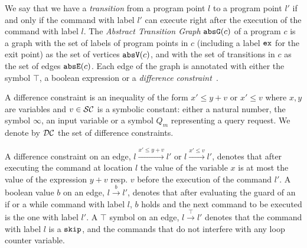 %
We say that we have a \emph{transition} from a program point $l$ to a
program point $l'$ if and only if the command with label $l'$ can
execute right after the execution of the command with label $l$.
The \emph{Abstract Transition Graph} $\mathtt{abs}{\mathtt{G}}(c)$ of a program $c$ is a
graph with the set of labels of program points in $c$  (including a 
label $\mathtt{ex}$ for the exit point) as the set of
vertices $\mathtt{abs}{\mathtt{V}}(c)$, and with the set of transitions in $c$ as the set of
edges $\mathtt{abs}{\mathtt{E}}(c)$. Each edge of the graph is annotated with either
the symbol $\top$, a boolean expression or a \emph{difference
constraint}~\cite{sinn2017complexity}.

A difference constraint is an inequality of the form $x' \leq y + v$ {or $x' \leq v$}
where $x, y$ are variables and $v \in \mathcal{SC}$ is a symbolic
constant: either a natural number, the symbol $\infty$, an input
variable or a symbol $Q_m$ representing a query request.  We denote by
$\mathcal{DC}$ the set of difference constraints.

A difference constraint on an edge, $l \xrightarrow{x' \leq y + v}
l'$ {or $l \xrightarrow{x' \leq v} l'$}, denotes that after executing the command at location $l$ the
value of the variable $x$ is at most the value of the expression $y +
v$ {resp. $v$} before the execution of the command $l'$.
A boolean value $b$ on an
edge, $l \xrightarrow{b} l'$, denotes that after evaluating the guard
of an if or a while command with label $l$, $b$ holds and the next
command to be executed is the one with label $l'$.  A $\top$ symbol on
an edge, $l \xrightarrow{\top} l'$ denotes that the command with label
$l$ is a $\mathtt{skip}$, {and the commands that do not interfere with any loop counter variable}.

